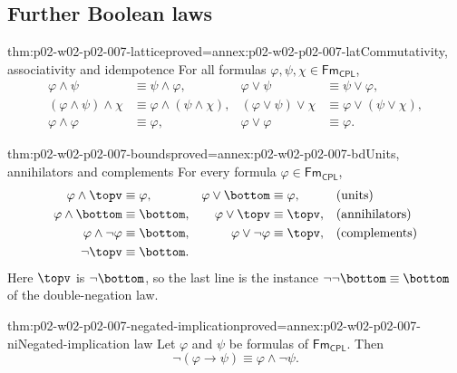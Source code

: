 \subsection{Further Boolean laws}
\label{sec:p02-w02-p02-007-further-laws}

\begin{hblemma}{thm:p02-w02-p02-007-lattice}{proved=annex:p02-w02-p02-007-lat}{Commutativity, associativity and idempotence}
For all formulas \(\varphi,\psi,\chi\in\mathsf{Fm}_{\mathsf{CPL}}\),
\[
\begin{aligned}
 \varphi\land\psi&\equiv\psi\land\varphi, &
 \varphi\lor\psi&\equiv\psi\lor\varphi,\\
 (\varphi\land\psi)\land\chi&\equiv\varphi\land(\psi\land\chi), &
 (\varphi\lor\psi)\lor\chi&\equiv\varphi\lor(\psi\lor\chi),\\
 \varphi\land\varphi&\equiv\varphi, &
 \varphi\lor\varphi&\equiv\varphi.
\end{aligned}
\]
\end{hblemma}

\begin{hblemma}{thm:p02-w02-p02-007-bounds}{proved=annex:p02-w02-p02-007-bd}{Units, annihilators and complements}
For every formula \(\varphi\in\mathsf{Fm}_{\mathsf{CPL}}\),
\[
\begin{aligned}
 \varphi\land\topv&\equiv\varphi, &
 \varphi\lor\bottom&\equiv\varphi, &&\text{(units)}\\
 \varphi\land\bottom&\equiv\bottom, &
 \varphi\lor\topv&\equiv\topv, &&\text{(annihilators)}\\
 \varphi\land\neg\varphi&\equiv\bottom, &
 \varphi\lor\neg\varphi&\equiv\topv, &&\text{(complements)}\\
 \neg\topv&\equiv\bottom. &&&&
\end{aligned}
\]
Here \(\topv\) is \(\neg\bottom\), so the last line is the instance
\(\neg\neg\bottom\equiv\bottom\) of the double-negation law.
\end{hblemma}

\begin{hblemma}{thm:p02-w02-p02-007-negated-implication}{proved=annex:p02-w02-p02-007-ni}{Negated-implication law}
Let \(\varphi\) and \(\psi\) be formulas of \(\mathsf{Fm}_{\mathsf{CPL}}\).
Then
\[
 \neg(\varphi\to\psi)\equiv\varphi\land\neg\psi.
\]
\end{hblemma}

